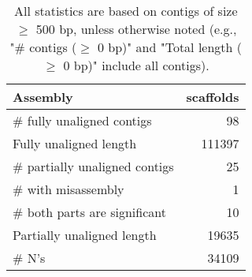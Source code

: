 \documentclass[12pt,a4paper]{article}
\begin{document}
\begin{table}[ht]
\begin{center}
\caption{All statistics are based on contigs of size $\geq$ 500 bp, unless otherwise noted (e.g., "\# contigs ($\geq$ 0 bp)" and "Total length ($\geq$ 0 bp)" include all contigs).}
\begin{tabular}{|l*{1}{|r}|}
\hline
Assembly & scaffolds \\ \hline
\# fully unaligned contigs & 98 \\ \hline
Fully unaligned length & 111397 \\ \hline
\# partially unaligned contigs & 25 \\ \hline
\hspace{5mm}\# with misassembly & 1 \\ \hline
\hspace{5mm}\# both parts are significant & 10 \\ \hline
Partially unaligned length & 19635 \\ \hline
\# N's & 34109 \\ \hline
\end{tabular}
\end{center}
\end{table}
\end{document}
